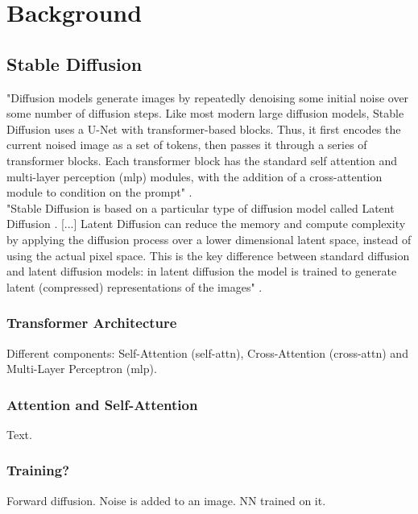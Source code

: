 \section{Background}



\subsection{Stable Diffusion}
"Diffusion models \cite{dhariwal2021diffusion, sohl2015deep, song2019generative} generate images by repeatedly denoising some initial noise over some number of diffusion steps. Like most modern large diffusion models, Stable Diffusion uses a U-Net \cite{ronneberger2015u} with transformer-based blocks. Thus, it first encodes the current noised image as a set of tokens, then passes it through a series of transformer blocks. Each transformer block has the standard self attention \cite{vaswani2017attention} and multi-layer perception (mlp) modules, with the addition of a cross-attention module to condition on the prompt" \cite{bolya2023tomesd}.\\
"Stable Diffusion is based on a particular type of diffusion model called Latent Diffusion \cite{Rombach_2022_CVPR}. [...] Latent Diffusion can reduce the memory and compute complexity by applying the diffusion process over a lower dimensional latent space, instead of using the actual pixel space. This is the key difference between standard diffusion and latent diffusion models: in latent diffusion the model is trained to generate latent (compressed) representations of the images" \cite{patil2022stable}.\\



\subsubsection{Transformer Architecture}
Different components: Self-Attention (self-attn), Cross-Attention (cross-attn) and Multi-Layer Perceptron (mlp).



\subsubsection{Attention and Self-Attention}
Text.



\subsubsection{Training?}
Forward diffusion. Noise is added to an image. NN trained on it.



